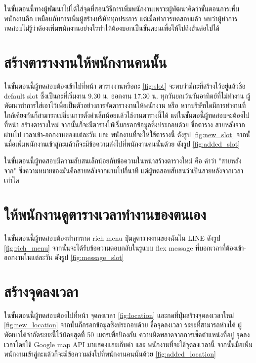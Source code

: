 ในขั้นตอนนี้ทางผู้พัฒนาไม่ได้ใส่จุดที่สอนวิธีการเพิ่มพนักงานเพราะผู้พัฒนาคิดว่าขั้นตอนการเพิ่มพนักงานอีก เหมือนกับการเพิ่มผู้สร้างบริษัททุกประการ แต่เมื่อทำการทดสอบแล้ว 
พบว่าผู้ทำการทดสอบไม่รู้ว่าต้องเพิ่มพนักงานอย่างไรทำให้ต้องบอกเป็นขั้นตอนเพื่อให้ไปถึงขั้นต่อไปได้

\section{สร้างตารางงานให้พนักงานคนนั้น}
ในขั้นตอนนี้ผู้ทดสอบต้องเข้าไปที่หน้า ตารางงานหรือกะ \ref{fig:slot} จะพบว่ามีกะที่สร้างไว้อยู่แล้วชื่อ default slot ซึ่งเป็นกะที่เริ่มงาน 9.30 น. ออกงาน 17.30 น. ทุกวันยกเว้นวันอาทิตย์ที่ไม่ทำงาน 
ผู้พัฒนาทำการใส่เอาไว้เพื่อเป็นตัวอย่างการจัดตารางงานให้พนักงาน หรือ หากบริษัทใดมีการทำงานที่ใกล้เคียงกันก็สามารถเปลี่ยนการตั้งค่าเล็กน้อยแล้วใช้งานตารางนี้ได้ แต่ในขั้นตอนี้ผู้ทดสอบจะต้องไปที่หน้า 
สร้างตารางใหม่ จากนั้นก็จะมีตารางให้เริ่มกรอกข้อมูลซึ่งประกอบด้วย ชื่อตาราง สายหลังจากผ่านไป เวลาเข้า-ออกงานของแต่ละวัน และ พนักงานที่จะให้ใช้ตารางนี้ ดังรูป \ref{fig:new_slot} 
จากนั้นมื่อเพิ่มพนักงานเข้าสู่กะแล้วก็จะมีข้อความส่งไปที่พนักงานคนนั้นด้วย ดังรูป \ref{fig:added_slot}

ในขั้นตอนนี้ผู้ทดสอบมีความสับสนเล็กน้อยกับข้อความในหน้าสร้างตารางใหม่ คือ คำว่า "สายหลังจาก" ซึ่งความหมายของมันคือสายหลังจากผ่านไปกี่นาที แต่ผู้ทดสอบสับสนว่าเป็นสายหลังจากเวลาเท่าใด

\section{ให้พนักงานดูตารางเวลาทำงานของตนเอง}
ในขั้นตอนนี้ผู้ทดสอบต้องทำการกด rich menu ปุ่มดูตารางงานของฉันใน LINE ดังรูป \ref{fig:rich_menu} จากนั้นจะได้รับข้อความตอบกลับในรูแบบ flex message ที่บอกเวลาที่ต้องเข้า-ออกงานในแต่ละวัน ดังรูป \ref{fig:message_slot}

\section{สร้างจุดลงเวลา}
ในขั้นตอนนี้ผู้ทดสอบต้องไปที่หน้า จุดลงเวลา \ref{fig:location} และกดที่ปุ่มสร้างจุดลงเวลาใหม่ \ref{fig:new_location} จากนั้นก็กรอกข้อมูลซึ่งประกอบด้วย ชื่อจุดลงเวลา ระยะที่สามารถห่างได้ 
ผู้พัฒนาได้จำกัดระยะนี้ไว้น้อยสุดที่ 50 เมตรเพื่อป้องกัน ความผิดพลาดจากการเช็คตำแหน่งที่อยู่ จุดลงเวลาโดยใช้ Google map API มาแสดงและเก็บค่า และ พนักงานที่จะใช้จุดลงเวลานี้ 
จากนั้นมื่อเพิ่มพนักงานเข้าสู่กะแล้วก็จะมีข้อความส่งไปที่พนักงานคนนั้นด้วย \ref{fig:added_location}

